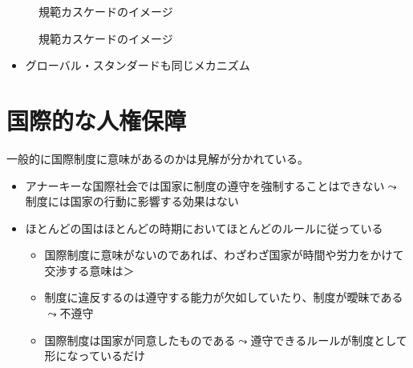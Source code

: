 \documentclass[
  xelatex,
  ja=standard]{bxjsarticle}
\providecommand{\tightlist}{%
  \setlength{\itemsep}{0pt}\setlength{\parskip}{0pt}}\usepackage{longtable,booktabs,array}
\begin{document}
\begin{figure}

\begin{minipage}[t]{0.50\linewidth}

{\centering 


\caption{規範カスケードのイメージ}

}

\end{minipage}%
%
\begin{minipage}[t]{0.50\linewidth}

{\centering 


\caption{規範カスケードのイメージ}

}

\end{minipage}%

\end{figure}

\begin{itemize}
\tightlist
\item
  グローバル・スタンダードも同じメカニズム
\end{itemize}

\hypertarget{ux56fdux969bux7684ux306aux4ebaux6a29ux4fddux969c}{%
\section{国際的な人権保障}\label{ux56fdux969bux7684ux306aux4ebaux6a29ux4fddux969c}}

一般的に国際制度に意味があるのかは見解が分かれている。

\begin{itemize}
\tightlist
\item
  アナーキーな国際社会では国家に制度の遵守を強制することはできない\(\leadsto\)制度には国家の行動に影響する効果はない\citep{mearsheimer2017}
\item
  ほとんどの国はほとんどの時期においてほとんどのルールに従っている\citep{henkin1979}

  \begin{itemize}
  \tightlist
  \item
    国際制度に意味がないのであれば、わざわざ国家が時間や労力をかけて交渉する意味は＞
  \item
    制度に違反するのは遵守する能力が欠如していたり、制度が曖昧である\(\leadsto\)不遵守\citep{chayes1993}
  \item
    国際制度は国家が同意したものである\(\leadsto\)遵守できるルールが制度として形になっているだけ\citep{downs1996}
  \end{itemize}
\end{itemize}
\end{document}
